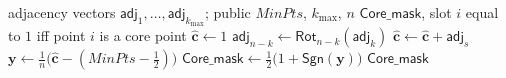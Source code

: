 \begin{algorithm}[t]
\caption{\textsf{Core\_check}}
\label{alg:core}
\begin{algorithmic}[1]
\Require adjacency vectors $\mathsf{adj}_1, \dots, \mathsf{adj}_{k_{\max}}$;
  public $\mathit{MinPts}$, $k_{\max}$, $n$
\Ensure $\mathsf{Core\_mask}$, slot $i$ equal to $1$ iff point $i$ is a
  core point
\State $\hat{\mathbf{c}} \gets 1$
  \State $\mathsf{adj}_{n-k} \gets \mathsf{Rot}_{n-k}(\mathsf{adj}_k)$
    \State $\hat{\mathbf{c}} \gets \hat{\mathbf{c}} + \mathsf{adj}_s$
  \EndFor
\EndFor
\State $\mathbf{y} \gets \tfrac{1}{n} \bigl( \hat{\mathbf{c}}
  - (\mathit{MinPts} - \tfrac{1}{2}) \bigr)$
\State $\mathsf{Core\_mask} \gets
  \tfrac{1}{2}\bigl( 1 + \mathsf{Sgn}(\mathbf{y}) \bigr)$
\State \Return $\mathsf{Core\_mask}$
\end{algorithmic}
\end{algorithm}
